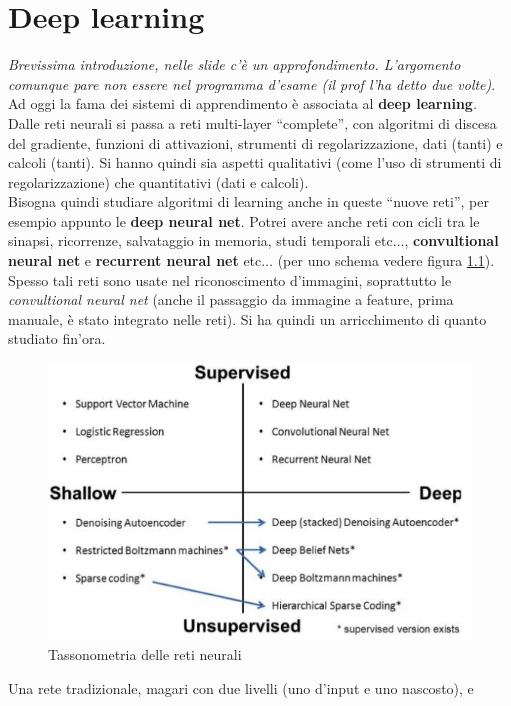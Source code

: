 \chapter{Deep learning}
\textit{Brevissima introduzione, nelle slide c'è un approfondimento. L'argomento
comunque pare non essere nel programma d'esame (il prof l'ha detto due
volte)}.\\ 
Ad oggi la fama dei sistemi di apprendimento è associata al \textbf{deep
  learning}.\\
Dalle reti neurali si passa a reti multi-layer ``complete'', con algoritmi di
discesa del gradiente, funzioni di attivazioni, strumenti di regolarizzazione,
dati (tanti) e calcoli (tanti). Si hanno quindi sia aspetti qualitativi (come
l'uso di strumenti di regolarizzazione) che quantitativi (dati e calcoli).\\
Bisogna quindi studiare algoritmi di learning anche in queste ``nuove reti'',
per esempio appunto le \textbf{deep neural net}. Potrei avere anche reti con
cicli tra le sinapsi, ricorrenze, salvataggio in memoria, studi temporali
etc$\ldots$, \textbf{convultional neural net} e \textbf{recurrent neural net}
etc$\ldots$ (per uno schema vedere figura \ref{fig:neu}). Spesso tali reti sono
usate nel riconoscimento d'immagini, soprattutto le \textit{convultional
  neural net} (anche il passaggio da immagine a feature, prima manuale, è
stato integrato nelle reti). Si ha quindi un arricchimento di quanto studiato
fin'ora.\\
\begin{figure}
  \centering
  \includegraphics[scale = 0.6]{img/neu.jpg}
  \caption{Tassonometria delle reti neurali}
  \label{fig:neu}
\end{figure}
Una rete tradizionale, magari con due livelli (uno d'input e uno nascosto), e
